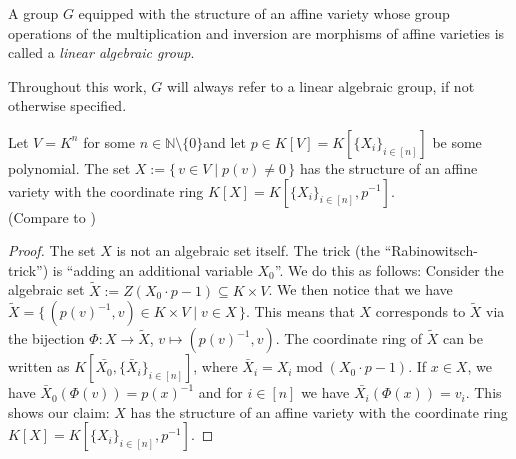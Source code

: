 \begin{definition}
  A group $G$ equipped with the structure of an affine variety whose group operations of the multiplication and inversion are morphisms of affine varieties is called a \textit{linear algebraic group}.
\end{definition}

Throughout this work, $G$ will always refer to a linear algebraic group, if not otherwise specified.

\begin{proposition}\label{rabbi}
  Let $V = K^n$ for some $n \in \mathbb{N} \setminus \{0\}$\linebreak and let $p \in K[V] = K[\{X_i\}_{i\in[n]}]$ be some polynomial.
  The set \linebreak$ X := \{\, v \in V \mid p(v) \neq 0 \,\}$ has the structure of an affine variety with the coordinate ring $K[X] = K[\{X_i\}_{i \in [n]}, p^{-1}]$.  \\
  (Compare to \cite{Rab30})
\end{proposition}

\begin{proof}
  The set $X$ is not an algebraic set itself.
  The trick (the ``Rabinowitsch-trick'') is ``adding an additional variable $X_0$''.
  We do this as follows:
  Consider the algebraic set $\tilde{X} := Z \left( X_0 \cdot p -1 \right) \subseteq K \times V$.
  We then notice that we have $\tilde{X} = \{\, (p(v)^{-1},v) \in K \times V \mid v \in X \,\}$.
  This means that $X$ corresponds to $\tilde{X}$ via the bijection $\Phi \colon X \rightarrow \tilde{X}$, $ v \mapsto (p(v)^{-1},v)$.
  The coordinate ring of $\tilde{X}$ can be written as $K[\bar{X_0}, \{\bar{X}_i\}_{i \in [n]}]$, where $\bar{X}_i = X_i \operatorname{mod} (X_0 \cdot p -1)$.
  If $x \in X$, we have $\bar{X}_0 (\Phi(v)) = p(x)^{-1}$ and for $ i \in [n] $ we have $\bar{X_i}(\Phi(x)) = v_i$.
  This shows our claim: $X$ has the structure of an affine variety with the coordinate ring $K[X] = K[\{X_i\}_{i \in [n]}, p^{-1}]$.
\end{proof}

